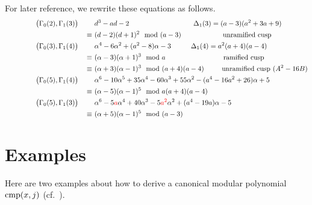 \documentclass{rs}
\theoremstyle{definition}
\theoremstyle{remark}
\newcommand{\cmp}{{\rm cmp}}
\newcommand{\md}{~~{\rm mod}~}
\newcommand{\A}{\alpha}
\renewcommand{\D}{\Delta}
\newcommand{\G}{\Gamma}
\renewcommand{\=}{\approx}
\renewcommand{\-}{\sim}
\newcommand{\rd}[1]{{\textcolor{red}{#1}}}
\numberwithin{equation}{section}
\begin{document}
For later reference, we rewrite these equations as follows.  
\[
 \hskip 1.55cm
 \begin{split}
  \big(\G_0(2),\G_1(3)\big) \qquad & ~ d^3 - a d - 2 \hskip 3.24cm \D_1(3) = (a - 3) (a^2 + 3 a + 9) \\
                            \equiv & ~ (d - 2) (d + 1)^2 \md (a - 3) \hskip 2.1cm \text{unramified cusp} \\
  \big(\G_0(3),\G_1(4)\big) \qquad & ~ \A^4 - 6 \A^2 + (a^2 - 8) \A - 3 \hskip 1cm \D_1(4) = a^2 (a + 4) (a - 4) \\
                            \equiv & ~ (\A - 3) (\A + 1)^3 \md a \hskip 2.92cm \text{ramified cusp} \\
                            \equiv & ~ (\A + 3) (\A - 1)^3 \md (a + 4) (a - 4) \hskip .9cm \text{unramified cusp ($A^2 - 16 B$)} \\
  \big(\G_0(5),\G_1(4)\big) \qquad & ~ \A^6 - 10 \A^5 + 35 \A^4 - 60 \A^3 + 55 \A^2 - (a^4 - 16 a^2 + 26) \A + 5 \\
                            \equiv & ~ (\A - 5) (\A - 1)^5 \md a (a + 4) (a - 4) \\
  \big(\G_0(5),\G_1(3)\big) \qquad & ~ \A^6 - 5 \rd{a} \A^4 + 40 \A^3 - 5 \rd{a^2} \A^2 + (a^4 - 19 a) \A - 5 \\
                            \equiv & ~ (\A + 5) (\A - 1)^5 \md (a - 3) 
 \end{split}
\]



\section{Examples}
\label{sec:ex}

Here are two examples about how to derive a canonical modular polynomial $\cmp(x,j)$ (cf.~\cite[Example 2.4]{Choi}).  
\end{document}
